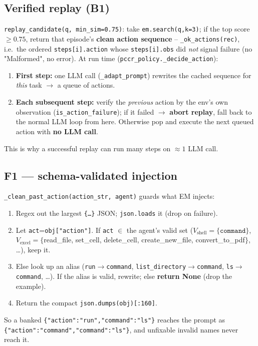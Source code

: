 \subsection{Verified replay (B1)}
\label{sec:gl-replay}
\texttt{replay\_candidate(q, min\_sim=0.75)}: take \texttt{em.search(q,k=3)}; if the top score
$\ge 0.75$, return that episode's \textbf{clean action sequence} -- \texttt{\_ok\_actions(rec)},
i.e.\ the ordered \texttt{steps[i].action} whose \texttt{steps[i].obs} did \emph{not} signal failure
(no "Malformed", no error). At run time (\texttt{pccr\_policy.\_decide\_action}):
\begin{enumerate}\itemsep1pt
\item \textbf{First step:} one LLM call (\texttt{\_adapt\_prompt}) rewrites the cached sequence for
\emph{this} task $\to$ a queue of actions.
\item \textbf{Each subsequent step:} verify the \emph{previous} action by the env's own observation
(\texttt{is\_action\_failure}); if it failed $\to$ \textbf{abort replay}, fall back to the normal LLM
loop from here. Otherwise pop and execute the next queued action with \textbf{no LLM call}.
\end{enumerate}
This is why a successful replay can run many steps on $\approx 1$ LLM call.

\subsection{F1 --- schema-validated injection}
\label{sec:gl-f1}
\texttt{\_clean\_past\_action(action\_str, agent)} guards what EM injects:
\begin{enumerate}\itemsep1pt
\item Regex out the largest \texttt{\{\dots\}} JSON; \texttt{json.loads} it (drop on failure).
\item Let \texttt{act}=\texttt{obj["action"]}. If \texttt{act} $\in$ the agent's valid set
($V_{\text{shell}}=\{\texttt{command}\}$, $V_{\text{excel}}=\{$read\_file, set\_cell, delete\_cell,
create\_new\_file, convert\_to\_pdf$\}$, \dots), keep it.
\item Else look up an alias (\texttt{run}$\to$\texttt{command}, \texttt{list\_directory}$\to$\texttt{command},
\texttt{ls}$\to$\texttt{command}, \dots). If the alias is valid, rewrite; else \textbf{return None}
(drop the example).
\item Return the compact \texttt{json.dumps(obj)[:160]}.
\end{enumerate}
So a banked \texttt{\{"action":"run","command":"ls"\}} reaches the prompt as
\texttt{\{"action":"command","command":"ls"\}}, and unfixable invalid names never reach it.

